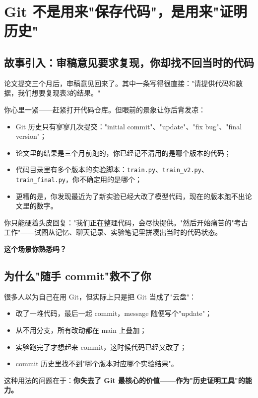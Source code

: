 \chapter{Git 不是用来"保存代码"，是用来"证明历史"}
\label{ch:git_proof}

\section{故事引入：审稿意见要求复现，你却找不回当时的代码}

论文提交三个月后，审稿意见回来了。其中一条写得很直接："请提供代码和数据，我们想要复现表3的结果。"

你心里一紧——赶紧打开代码仓库。但眼前的景象让你后背发凉：

\begin{itemize}
  \item Git 历史只有寥寥几次提交："initial commit"、"update"、"fix bug"、"final version"；
  \item 论文里的结果是三个月前跑的，你已经记不清用的是哪个版本的代码；
  \item 代码目录里有多个版本的实验脚本：\texttt{train.py}、\texttt{train\_v2.py}、\texttt{train\_final.py}，你不确定用的是哪个；
  \item 更糟的是，你发现最近为了新实验已经大改了模型代码，现在的版本跑不出论文里的数字。
\end{itemize}

你只能硬着头皮回复："我们正在整理代码，会尽快提供。"然后开始痛苦的"考古工作"——试图从记忆、聊天记录、实验笔记里拼凑出当时的代码状态。

\textbf{这个场景你熟悉吗？}

\section{为什么"随手 commit"救不了你}

很多人以为自己在用 Git，但实际上只是把 Git 当成了"云盘"：

\begin{itemize}
  \item 改了一堆代码，最后一起 commit，message 随便写个"update"；
  \item 从不用分支，所有改动都在 main 上叠加；
  \item 实验跑完了才想起来 commit，这时候代码已经又改了；
  \item commit 历史里找不到"哪个版本对应哪个实验结果"。
\end{itemize}

这种用法的问题在于：\textbf{你失去了 Git 最核心的价值——作为"历史证明工具"的能力。}

